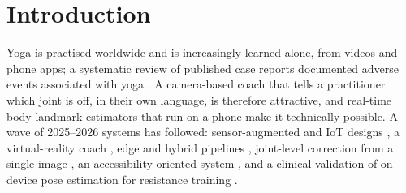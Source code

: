 \section{Introduction}\label{sec:intro}
Yoga is practised worldwide and is increasingly learned alone, from videos and phone apps; a systematic review of published case reports documented adverse events associated with yoga \cite{cramer2013yoga}. A camera-based coach that tells a practitioner which joint is off, in their own language, is therefore attractive, and real-time body-landmark estimators that run on a phone \cite{bazarevsky2020blazepose,lugaresi2019mediapipe} make it technically possible. A wave of 2025--2026 systems has followed: sensor-augmented and IoT designs \cite{yuan2025gtanet,sathyapriya2026posture,kamble2026yogamat,saravanapandian2025mat}, a virtual-reality coach \cite{srinivasakumar2025yogavr}, edge and hybrid pipelines \cite{gadhvi2025posepilot,haldar2026framework,vallabhaneni2026hybrid}, joint-level correction from a single image \cite{chi2026sage}, an accessibility-oriented system \cite{aggarwal2026chair}, and a clinical validation of on-device pose estimation for resistance training \cite{heo2026ondevice}.

